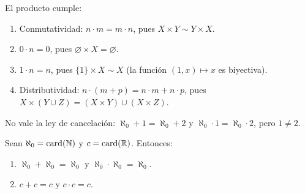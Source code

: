 \begin{prop}
  El producto cumple:
  \begin{enumerate}[label=(\arabic*)]
    \item Conmutatividad: \(n \cdot m = m \cdot n\), pues \(X \times Y \sim Y \times X\).
    \item \(0 \cdot n = 0\), pues \(\varnothing \times X = \varnothing\).
    \item \(1 \cdot n = n\), pues \(\{1\} \times X \sim X\) (la función \((1, x) \mapsto x\) es biyectiva).
    \item Distributividad: \(n \cdot (m + p) = n \cdot m + n \cdot p\), pues \(X \times (Y \cup Z) = (X \times Y) \cup (X \times Z)\).
  \end{enumerate}
\end{prop}

\begin{note}
  No vale la ley de cancelación: \(\aleph_0 + 1 = \aleph_0 + 2\) y \(\aleph_0 \cdot 1 = \aleph_0 \cdot 2\), pero \(1 \neq 2\).
\end{note}

\begin{eg}
  Sean \(\aleph_0 = \operatorname{card}(\mathbb{N})\) y \(c = \operatorname{card}(\mathbb{R})\). Entonces:
  \begin{enumerate}[label=(\arabic*)]
    \item \(\aleph_0 + \aleph_0 = \aleph_0\) y \(\aleph_0 \cdot \aleph_0 = \aleph_0\).
    \item \(c + c = c\) y \(c \cdot c = c\).
  \end{enumerate}
\end{eg}

